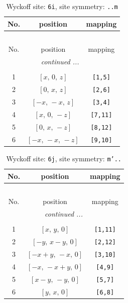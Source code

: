 \documentclass[fleqn,8pt]{jsarticle}
\begin{document}
\renewcommand{\arraystretch}{1.2}
\begin{longtable}{ccc}
\caption{Wyckoff site: {\tt 6i}, site symmetry: {\tt ..m}}
 \\
 \hline \hline
No. & position & mapping \\ \hline \endfirsthead

\multicolumn{2}{l}{\tablename\ \thetable{}} \\
 \hline \hline
No. & position & mapping \\ \hline \endhead

 \hline \hline
\multicolumn{2}{r}{\footnotesize\it continued ...} \\ \endfoot

 \hline \hline
\multicolumn{2}{r}{} \\ \endlastfoot

1 & $\left[ x,\, 0,\, z \right]$ & {\tt [1,5]} \\ \hline
2 & $\left[ 0,\, x,\, z \right]$ & {\tt [2,6]} \\ \hline
3 & $\left[ - x,\, - x,\, z \right]$ & {\tt [3,4]} \\ \hline
4 & $\left[ x,\, 0,\, - z \right]$ & {\tt [7,11]} \\ \hline
5 & $\left[ 0,\, x,\, - z \right]$ & {\tt [8,12]} \\ \hline
6 & $\left[ - x,\, - x,\, - z \right]$ & {\tt [9,10]} \\
\end{longtable}
\renewcommand{\arraystretch}{1.2}
\begin{longtable}{ccc}
\caption{Wyckoff site: {\tt 6j}, site symmetry: {\tt m'..}}
 \\
 \hline \hline
No. & position & mapping \\ \hline \endfirsthead

\multicolumn{2}{l}{\tablename\ \thetable{}} \\
 \hline \hline
No. & position & mapping \\ \hline \endhead

 \hline \hline
\multicolumn{2}{r}{\footnotesize\it continued ...} \\ \endfoot

 \hline \hline
\multicolumn{2}{r}{} \\ \endlastfoot

1 & $\left[ x,\, y,\, 0 \right]$ & {\tt [1,11]} \\ \hline
2 & $\left[ - y,\, x - y,\, 0 \right]$ & {\tt [2,12]} \\ \hline
3 & $\left[ - x + y,\, - x,\, 0 \right]$ & {\tt [3,10]} \\ \hline
4 & $\left[ - x,\, - x + y,\, 0 \right]$ & {\tt [4,9]} \\ \hline
5 & $\left[ x - y,\, - y,\, 0 \right]$ & {\tt [5,7]} \\ \hline
6 & $\left[ y,\, x,\, 0 \right]$ & {\tt [6,8]} \\
\end{longtable}
\end{document}
